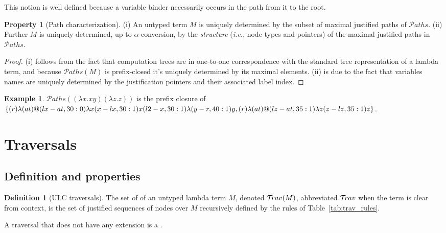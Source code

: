 \documentclass{article}
\makeatletter
\theoremstyle{definition}
\newtheorem{definition}{Definition}[section]
\newtheorem{property}{Property}[section]
\newtheorem{example}{Example}[section]
\newcommand{\travulc}{\travset}
\newcommand\pathset{{\mathcal{P}aths}} %
\renewcommand\ie{{\it i.e.\@\xspace}}
\makeatother
\begin{document}
This notion is well defined because a variable binder necessarily occurs in the path from it to the root.
\begin{property}[Path characterization]
\label{prop:tree_path_charact}
(i) An untyped term $M$ is uniquely determined by the subset of maximal justified paths of $\pathset$.
(ii) Further $M$ is uniquely determined, up to $\alpha$-conversion, by the \emph{structure} (\ie, node types and pointers) of the maximal justified paths in $\pathset$.
\end{property}
\begin{proof}
(i) follows from the fact that computation trees are in one-to-one correspondence with the standard tree representation of a lambda term, and because $\pathset(M)$ is prefix-closed it's uniquely determined by its maximal elements. (ii) is due to the fact that variables names are uniquely determined by the justification pointers and their associated label index.
\end{proof}

\begin{example}
  $\pathset((\lambda x.x y) (\lambda z.z))$ is the prefix closure of
  $\{
  \Pstr{ (r){\lambda} (at){@} (lx-at,30:0){\lambda x} (x-lx,30:1){x} (l2-x,30:1){\lambda} (y-r,40:1){y} },
  \Pstr{ (r){\lambda} (at){@} (lz-at,35:1){\lambda z} (z-lz,35:1){z}}
  \}$.
\end{example}


\section{Traversals}

\subsection{Definition and properties}

\begin{definition}[ULC traversals]
The set of  of an untyped lambda term $M$, denoted $\travulc(M)$, abbreviated $\travulc$ when the term is clear from context, is the set of justified sequences of nodes over $M$ recursively defined by the rules of Table~\ref{tab:trav_rules}.

A traversal that does not have any extension is a .
\end{definition}
\end{document}
